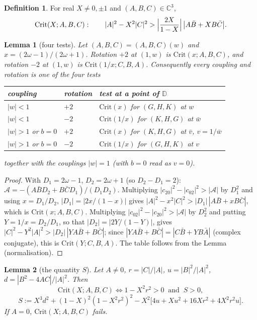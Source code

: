 \documentclass[11pt,reqno]{amsart}
\theoremstyle{plain}
\newtheorem*{lemma}{Lemma}
\theoremstyle{definition}
\newtheorem*{definition}{Definition}
\theoremstyle{remark}
\newcommand{\C}{\mathbb{C}}
\newcommand{\Crit}{\mathrm{Crit}}
\begin{document}
\begin{definition}
For real $X\ne0,\pm1$ and $(A,B,C)\in\C^{3}$,
\[
  \Crit(X;A,B,C):\qquad |A|^{2}-X^{2}|C|^{2}>\Bigl|\frac{2X}{1-X}\Bigr|\,\bigl|A\bar B+XB\bar C\bigr| .
\]
\end{definition}

\begin{lemma}[four tests]
Let $(A,B,C)=(A,B,C)(w)$ and $x=(2\omega-1)/(2\omega+1)$. Rotation $+2$ at $(1,w)$ is
$\Crit(x;A,B,C)$, and rotation $-2$ at $(1,w)$ is $\Crit(1/x;C,B,A)$. Consequently every
coupling and rotation is one of the four tests
\begin{center}
\begin{tabular}{lll}
coupling & rotation & test at a point of $\mathbb D$\\\hline
$|w|<1$ & $+2$ & $\Crit(x)$ for $(G,H,K)$ at $w$\\
$|w|<1$ & $-2$ & $\Crit(1/x)$ for $(K,H,G)$ at $\bar w$\\
$|w|>1$ or $b=0$ & $+2$ & $\Crit(x)$ for $(K,H,G)$ at $\bar v$, $v=1/\bar w$\\
$|w|>1$ or $b=0$ & $-2$ & $\Crit(1/x)$ for $(G,H,K)$ at $v$
\end{tabular}
\end{center}
together with the couplings $|w|=1$ (with $b=0$ read as $v=0$).
\end{lemma}

\begin{proof}
With $D_1=2\omega-1$, $D_2=2\omega+1$ (so $D_2-D_1=2$):
$\mathcal A=-(A\bar BD_2+B\bar CD_1)/(D_1D_2)$. Multiplying $|c_{20}|^{2}-|c_{02}|^{2}>|\mathcal A|$ by
$D_1^{2}$ and using $x=D_1/D_2$, $|D_1|=|2x/(1-x)|$ gives
$|A|^{2}-x^{2}|C|^{2}>|D_1|\,|A\bar B+xB\bar C|$, which is $\Crit(x;A,B,C)$. Multiplying
$|c_{02}|^{2}-|c_{20}|^{2}>|\mathcal A|$ by $D_2^{2}$ and putting $Y=1/x=D_2/D_1$, so that
$|D_2|=|2Y/(1-Y)|$, gives $|C|^{2}-Y^{2}|A|^{2}>|D_2|\,|YA\bar B+B\bar C|$; since
$|YA\bar B+B\bar C|=|C\bar B+YB\bar A|$ (complex conjugate), this is $\Crit(Y;C,B,A)$. The table follows from the Lemma (normalisation).
\end{proof}

\begin{lemma}[the quantity $S$]
Let $A\ne0$, $r=|C|/|A|$, $u=|B|^{2}/|A|^{2}$, $d=|B^{2}-4AC|/|A|^{2}$. Then
\[
  \Crit(X;A,B,C)\iff 1-X^{2}r^{2}>0\ \text{ and }\ S>0,
\]
\[
  S:=X^{3}d^{2}+(1-X)^{2}(1-X^{2}r^{2})^{2}-X^{2}\bigl[4u+Xu^{2}+16Xr^{2}+4X^{2}r^{2}u\bigr].
\]
If $A=0$, $\Crit(X;A,B,C)$ fails.
\end{lemma}
\end{document}
